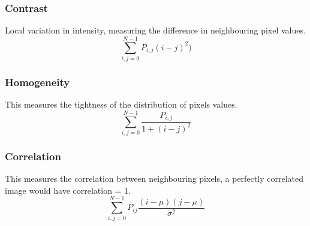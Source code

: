 \subsubsection{Contrast}
Local variation in intensity, measuring the difference in neighbouring pixel values. \begin{equation}
    \sum^{N-1}_{i,j=0}P_{i,j}(i-j)^2)
\end{equation}

\subsubsection{Homogeneity}
This measures the tightness of the distribution of pixels values.
\begin{equation}
    \sum^{N-1}_{i,j=0} \frac{P_{i,j}}{1+(i-j)^2}
\end{equation}

\subsubsection{Correlation}
This measures the correlation between neighbouring pixels, a perfectly correlated image would have correlation = 1. 
\begin{equation}
    \sum^{N-1}_{i,j=0} P_{ij} \frac{(i-\mu)(j-\mu)}{\sigma^2}
\end{equation}


